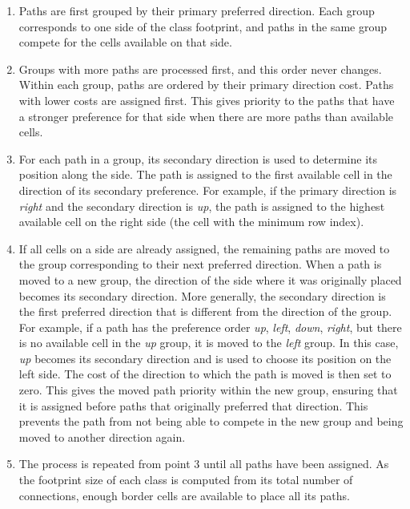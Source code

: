 \documentclass[../../main.tex]{subfiles}
\begin{document}
\begin{enumerate}

    \item Paths are first grouped by their primary preferred direction. Each group corresponds to one side of the class footprint, and paths in the same group compete for the cells available on that side. 

    \item Groups with more paths are processed first, and this order never changes. Within each group, paths are ordered by their primary direction cost. Paths with lower costs are assigned first. This gives priority to the paths that have a stronger preference for that side when there are more paths than available cells.

    \item For each path in a group, its secondary direction is used to determine its position along the side. The path is assigned to the first available cell in the direction of its secondary preference. For example, if the primary direction is \textit{right} and the secondary direction is \textit{up}, the path is assigned to the highest available cell on the right side (\ie the cell with the minimum row index).

    \item If all cells on a side are already assigned, the remaining paths are moved to the group corresponding to their next preferred direction. When a path is moved to a new group, the direction of the side where it was originally placed becomes its secondary direction. More generally, the secondary direction is the first preferred direction that is different from the direction of the group. For example, if a path has the preference order \textit{up}, \textit{left}, \textit{down}, \textit{right}, but there is no available cell in the \textit{up} group, it is moved to the \textit{left} group. In this case, \textit{up} becomes its secondary direction and is used to choose its position on the left side. The cost of the direction to which the path is moved is then set to zero. This gives the moved path priority within the new group, ensuring that it is assigned before paths that originally preferred that direction. This prevents the path from not being able to compete in the new group and being moved to another direction again.
    
    \item The process is repeated from point 3 until all paths have been assigned. As the footprint size of each class is computed from its total number of connections, enough border cells are available to place all its paths.

\end{enumerate}
\end{document}
